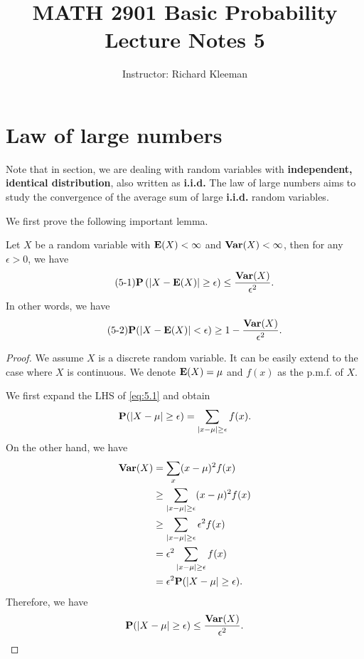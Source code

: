 


\title{MATH 2901 Basic Probability Lecture Notes 5}
\author{Instructor: Richard Kleeman}
\date{}
\maketitle


\section{Law of large numbers}
Note that in section, we are dealing with random variables with \textbf{independent, identical distribution}, also written as \textbf{i.i.d.} The law of large numbers aims to study the convergence of the average sum of large \textbf{i.i.d.} random variables.

We first prove the following important lemma.
\begin{lemma}
Let $X$ be a random variable with $\mathbf{E}(X) < \infty$ and $\mathbf{Var}(X) < \infty$, then for any $\epsilon > 0$, we have
\begin{equation}
    \label{eq:5.1}
    \tag{5-1}
    \mathbf{P}\left( \left\vert X-\mathbf{E}(X) \right\vert \geq \epsilon \right) \leq \frac{\mathbf{Var}(X)}{\epsilon^2}.
\end{equation}
In other words, we have
\begin{equation}
    \label{eq:5.2}
    \tag{5-2}
    \mathbf{P}(\left\vert X-\mathbf{E}(X) \right\vert < \epsilon) \geq 1-\frac{\mathbf{Var}(X)}{\epsilon^2}.
\end{equation}
\end{lemma}

\begin{proof}
We assume $X$ is a discrete random variable. It can be easily extend to the case where $X$ is continuous. We denote $\mathbf{E}(X) = \mu$ and $f(x)$ as the p.m.f. of $X$.

We first expand the LHS of \eqref{eq:5.1} and obtain
\begin{equation*}
    \mathbf{P}(\left\vert X-\mu \right\vert \geq \epsilon)  = \sum_{\left\vert x-\mu \right\vert\geq \epsilon} f(x).
\end{equation*}
On the other hand, we have
\begin{equation*}
    \begin{split}
        \mathbf{Var}(X) &= \sum_{x} (x-\mu)^2 f(x) \\
        &\geq \sum_{\left\vert x-\mu \right\vert \geq \epsilon} (x-\mu)^2 f(x) \\
        &\geq \sum_{\left\vert x-\mu \right\vert \geq \epsilon} \epsilon^2 f(x) \\
        &= \epsilon^2 \sum_{\left\vert x-\mu \right\vert \geq \epsilon} f(x) \\ &= \epsilon^2 \mathbf{P}(\left\vert X-\mu \right\vert \geq \epsilon).
    \end{split}
\end{equation*}
Therefore, we have 
\begin{equation*}
    \mathbf{P}(\left\vert X-\mu \right\vert \geq \epsilon) \leq \frac{\mathbf{Var}(X)}{\epsilon^2}.
\end{equation*}
\end{proof}

